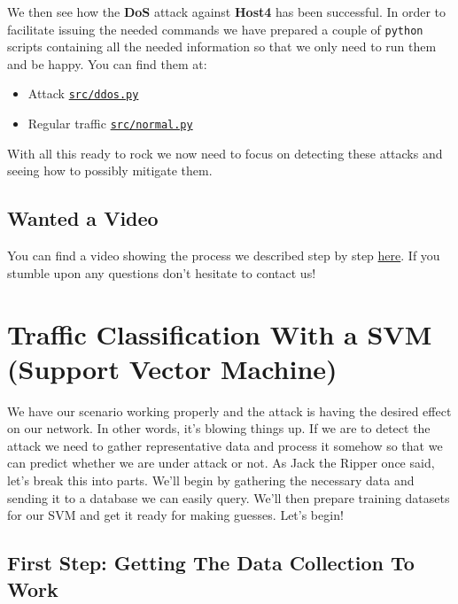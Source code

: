 \documentclass[12pt]{article}
\begin{document}
		We then see how the \textbf{DoS} attack against \textbf{Host4} has been successful. In order to facilitate issuing the needed commands we have prepared a couple of \texttt{python} scripts containing all the needed information so that we only need to run them and be happy. You can find them at:

		\begin{itemize}
			\item Attack \href{https://github.com/GAR-Project/project/blob/master/src/ddos.py}{\texttt{src/ddos.py}}
			\item Regular traffic \href{https://github.com/GAR-Project/project/blob/master/src/normal.py}{\texttt{src/normal.py}}
		\end{itemize}

		With all this ready to rock we now need to focus on detecting these attacks and seeing how to possibly mitigate them.

	\subsection{Wanted a Video}
		You can find a video showing the process we described step by step \href{https://www.youtube.com/watch?v=ofZPmV6_y_M}{here}. If you stumble upon any questions don't hesitate to contact us!

\newpage

\section{Traffic Classification With a SVM (\textbf{S}upport \textbf{V}ector \textbf{M}achine)}
	We have our scenario working properly and the attack is having the desired effect on our network. In other words, it's blowing things up. If we are to detect the attack we need to gather representative data and process it somehow so that we can predict whether we are under attack or not. As Jack the Ripper once said, let's break this into parts. We'll begin by gathering the necessary data and sending it to a database we can easily query. We'll then prepare training datasets for our SVM and get it ready for making guesses. Let's begin!

	\subsection{First Step: Getting The Data Collection To Work}
\end{document}
